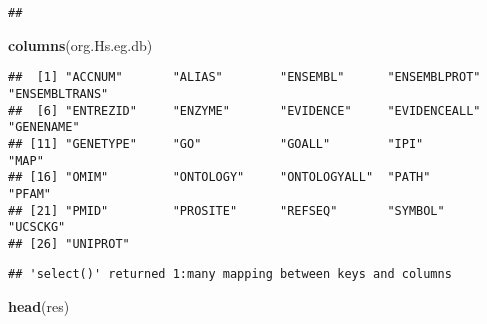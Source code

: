 \documentclass[
]{article}
\newenvironment{Shaded}{\begin{snugshade}}{\end{snugshade}}
\newcommand{\AttributeTok}[1]{\textcolor[rgb]{0.13,0.29,0.53}{#1}}
\newcommand{\CommentTok}[1]{\textcolor[rgb]{0.56,0.35,0.01}{\textit{#1}}}
\newcommand{\FunctionTok}[1]{\textcolor[rgb]{0.13,0.29,0.53}{\textbf{#1}}}
\newcommand{\NormalTok}[1]{#1}
\newcommand{\OtherTok}[1]{\textcolor[rgb]{0.56,0.35,0.01}{#1}}
\newcommand{\SpecialCharTok}[1]{\textcolor[rgb]{0.81,0.36,0.00}{\textbf{#1}}}
\newcommand{\StringTok}[1]{\textcolor[rgb]{0.31,0.60,0.02}{#1}}
\begin{document}
\begin{verbatim}
## 
\end{verbatim}

\begin{Shaded}
\begin{Highlighting}[]
\FunctionTok{columns}\NormalTok{(org.Hs.eg.db)}
\end{Highlighting}
\end{Shaded}

\begin{verbatim}
##  [1] "ACCNUM"       "ALIAS"        "ENSEMBL"      "ENSEMBLPROT"  "ENSEMBLTRANS"
##  [6] "ENTREZID"     "ENZYME"       "EVIDENCE"     "EVIDENCEALL"  "GENENAME"    
## [11] "GENETYPE"     "GO"           "GOALL"        "IPI"          "MAP"         
## [16] "OMIM"         "ONTOLOGY"     "ONTOLOGYALL"  "PATH"         "PFAM"        
## [21] "PMID"         "PROSITE"      "REFSEQ"       "SYMBOL"       "UCSCKG"      
## [26] "UNIPROT"
\end{verbatim}

\begin{Shaded}
\end{Shaded}

\begin{verbatim}
## 'select()' returned 1:many mapping between keys and columns
\end{verbatim}

\begin{Shaded}
\begin{Highlighting}[]
\FunctionTok{head}\NormalTok{(res)}
\end{Highlighting}
\end{Shaded}
\end{document}
